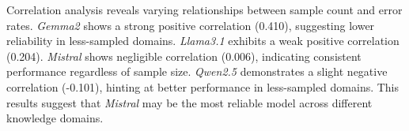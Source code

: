 Correlation analysis reveals varying relationships between sample count and error rates.
\textit{Gemma2} shows a strong positive correlation (0.410), suggesting lower reliability in less-sampled domains.
\textit{Llama3.1} exhibits a weak positive correlation (0.204).
\textit{Mistral} shows negligible correlation (0.006), indicating consistent performance regardless of sample size.
\textit{Qwen2.5} demonstrates a slight negative correlation (-0.101), hinting at better performance in less-sampled domains.
This results suggest that \textit{Mistral} may be the most reliable model across different knowledge domains.